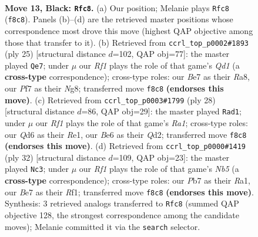 \documentclass[11pt]{article}
\begin{document}
\clearpage

\begin{figure}[p]\centering
\begin{subfigure}{0.46\textwidth}\centering
\resizebox{\linewidth}{!}{%
\newchessgame
\chessboard[
  setfen={1r3rk1/ppp1bpPp/1n1qb3/4p3/P2nP3/2N2NP1/1P3PB1/R1BQK2R b KQ - 0 13},
  showmover=false,
  pgfstyle=straightmove, color=movearrow, markmove={f8-c8}
]}
\caption{}
\end{subfigure}\hfill
\begin{subfigure}{0.46\textwidth}\centering
\resizebox{\linewidth}{!}{%
\newchessgame
\chessboard[
  setfen={r2qkbnr/ppp5/4b3/4pp2/2Pn2Pp/2N1BP1P/PP2N1B1/R2QK2R b KQkq - 2 13},
  showmover=false,
  pgfstyle=straightmove, color=movearrow, markmove={d8-e7}
]}
\caption{}
\end{subfigure}
\\[4pt]
\begin{subfigure}{0.46\textwidth}\centering
\resizebox{\linewidth}{!}{%
\newchessgame
\chessboard[
  setfen={r1bqr1k1/1p3pp1/p1nb1n1p/3p4/3N4/2NBB2P/PPPQ1PP1/R3R2K w - - 0 15},
  showmover=false,
  pgfstyle=straightmove, color=movearrow, markmove={a1-d1}
]}
\caption{}
\end{subfigure}\hfill
\begin{subfigure}{0.46\textwidth}\centering
\resizebox{\linewidth}{!}{%
\newchessgame
\chessboard[
  setfen={2k1rbnr/1pp2pp1/p3q3/1N1pNb2/1n1P1P2/4P3/PP1BB1QP/R4RK1 w - - 0 17},
  showmover=false,
  pgfstyle=straightmove, color=movearrow, markmove={b5-c3}
]}
\caption{}
\end{subfigure}
\caption{\textbf{Move 13, Black: \texttt{Rfc8}.} (a) Our position; Melanie plays \texttt{Rfc8} (\texttt{f8c8}). Panels (b)--(d) are the retrieved master positions whose correspondence most drove this move (highest QAP objective among those that transfer to it). (b) Retrieved from \texttt{ccrl\_top\_p0002\#1893} (ply 25) [structural distance $d$=102, QAP obj=77]: the master played \texttt{Qe7}; under $\mu$ our \emph{Rf1} plays the role of that game's \emph{Qd1} (a \textbf{cross-type} correspondence); cross-type roles: our \emph{B}e7 as their \emph{R}a8, our \emph{P}f7 as their \emph{N}g8; transferred move \texttt{f8c8} \textbf{(endorses this move)}. (c) Retrieved from \texttt{ccrl\_top\_p0003\#1799} (ply 28) [structural distance $d$=86, QAP obj=29]: the master played \texttt{Rad1}; under $\mu$ our \emph{Rf1} plays the role of that game's \emph{Ra1}; cross-type roles: our \emph{Q}d6 as their \emph{R}e1, our \emph{B}e6 as their \emph{Q}d2; transferred move \texttt{f8c8} \textbf{(endorses this move)}. (d) Retrieved from \texttt{ccrl\_top\_p0000\#1419} (ply 32) [structural distance $d$=109, QAP obj=23]: the master played \texttt{Nc3}; under $\mu$ our \emph{Rf1} plays the role of that game's \emph{Nb5} (a \textbf{cross-type} correspondence); cross-type roles: our \emph{P}b7 as their \emph{R}a1, our \emph{B}e7 as their \emph{R}f1; transferred move \texttt{f8c8} \textbf{(endorses this move)}. Synthesis: 3 retrieved analogs transferred to \texttt{Rfc8} (summed QAP objective 128, the strongest correspondence among the candidate moves); Melanie committed it via the \texttt{search} selector.}
\label{fig:thought-m25}
\end{figure}
\end{document}
